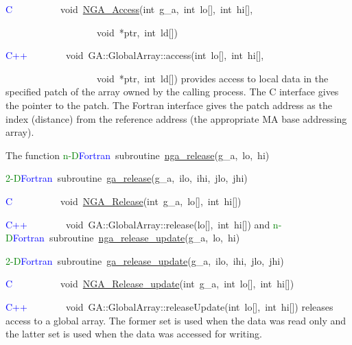 \textcolor{blue}{C}~~~~~~~~~~void~\href{http://www.emsl.pnl.gov/docs/global/c_nga_ops.html\#ga_access}{NGA\_{}Access}(int~g\_a,~int~lo{[}{]},~int~hi{[}{]},

~~~~~~~~~~~~~~~~~~~void~{*}ptr,~int~ld{[}{]})~

\textcolor{blue}{C++~}~~~~~~~void~GA::GlobalArray::access(int~lo{[}{]},~int~hi{[}{]},~

~~~~~~~~~~~~~~~~~~~void~{*}ptr,~int~ld{[}{]})
provides access to local data in the specified patch of the array
owned by the calling process. The C interface gives the pointer to
the patch. The Fortran interface gives the patch address as the index
(distance) from the reference address (the appropriate MA base addressing
array).

The function
\textcolor{green}{n-D}\textcolor{blue}{Fortran}~subroutine~\href{http://www.emsl.pnl.gov/docs/global/ga_ops.html\#ga_release}{nga\_{}release}(g\_a,~lo,~hi)~

\textcolor{green}{2-D}\textcolor{blue}{Fortran~}subroutine~\href{http://www.emsl.pnl.gov/docs/global/ga_ops.html\#ga_release}{ga\_{}release}(g\_a,~ilo,~ihi,~jlo,~jhi)~

\textcolor{blue}{C}~~~~~~~~~~void~\href{http://www.emsl.pnl.gov/docs/global/c_nga_ops.html\#ga_release}{NGA\_{}Release}(int~g\_a,~lo{[}{]},~int~hi{[}{]})

\textcolor{blue}{C++~}~~~~~~~void~GA::GlobalArray::release(lo{[}{]},~int~hi{[}{]})
and
\textcolor{green}{n-D}\textcolor{blue}{Fortran}~subroutine~\href{http://www.emsl.pnl.gov/docs/global/ga_ops.html\#ga_release_update}{nga\_{}release\_{}update}(g\_a,~lo,~hi)~

\textcolor{green}{2-D}\textcolor{blue}{Fortran}~subroutine~\href{http://www.emsl.pnl.gov/docs/global/ga_ops.html\#ga_release_update}{ga\_{}release\_{}update}(g\_a,~ilo,~ihi,~jlo,~jhi)

\textcolor{blue}{C}~~~~~~~~~~void~\href{http://www.emsl.pnl.gov/docs/global/c_nga_ops.html\#ga_release_update}{NGA\_{}Release\_{}update}(int~g\_a,~int~lo{[}{]},~int~hi{[}{]})~

\textcolor{blue}{C++~}~~~~~~~void~GA::GlobalArray::releaseUpdate(int~lo{[}{]},~int~hi{[}{]})
releases access to a global array. The former set is used when the
data was read only and the latter set is used when the data was accessed
for writing.

